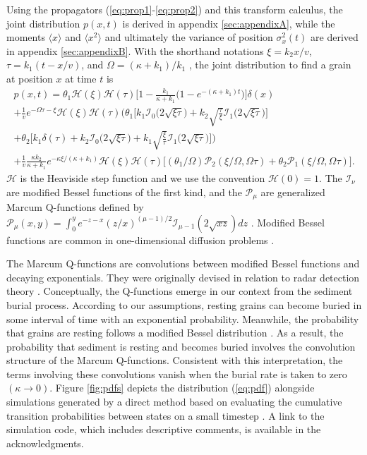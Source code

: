 \documentclass[]{agujournal2018}
\newcommand\bra{\langle}
\newcommand\ket{\rangle}
\begin{document}
Using the propagators (\ref{eq:prop1}-\ref{eq:prop2}) and this transform calculus, the joint distribution $p(x,t)$ is derived in appendix \ref{sec:appendixA}, while the moments $\bra x \ket$ and $\bra x^2 \ket$ and ultimately the variance of position $\sigma_x^2(t)$ are derived in appendix \ref{sec:appendixB}. With the shorthand notations $\xi = k_2 x/v$, $\tau = k_1(t-x/v)$, and $\Omega = (\kappa+k_1)/k_1$ \citep[cf.][]{Lisle1998}, the joint distribution to find a grain at position $x$ at time $t$ is 
\begin{multline}
p(x,t) = \theta_1\mathcal{H}(\xi)\mathcal{H}(\tau)\Big[1-\frac{k_1}{\kappa+k_1}\Big(1-e^{-(\kappa+k_1)t}\Big)\Big]\delta(x) \\ + \frac{1}{v}e^{-\Omega \tau - \xi}\mathcal{H}(\xi)\mathcal{H}(\tau)\Big(\theta_1\Big[k_1\mathcal{I}_0\big(2\sqrt{\xi\tau}\big) + k_2\sqrt{\frac{\tau}{\xi}}\mathcal{I}_1\big(2\sqrt{\xi\tau}\big)\Big] \\ + \theta_2\Big[k_1\delta(\tau) + k_2 \mathcal{I}_0\big(2\sqrt{\xi\tau}\big)+k_1 \sqrt{\frac{\xi}{\tau}}\mathcal{I}_1\big(2\sqrt{\xi\tau}\big)\Big]\Big) \\
+ \frac{1}{v}\frac{\kappa k_2}{\kappa + k_1}e^{-\kappa \xi/(\kappa + k_1)}\mathcal{H}(\xi)\mathcal{H}(\tau)\Big[(\theta_1/\Omega)\mathcal{P}_2(\xi/\Omega,\Omega\tau) + \theta_2 \mathcal{P}_1(\xi/\Omega,\Omega\tau)\Big].
\label{eq:pdf}
\end{multline}
$\mathcal{H}$ is the Heaviside step function and we use the convention $\mathcal{H}(0)=1$.
The $\mathcal{I}_\nu$ are modified Bessel functions of the first kind, and the $\mathcal{P}_\mu$ are generalized Marcum Q-functions defined by $\mathcal{P}_\mu(x,y) = \int_0^y e^{-z-x}(z/x)^{(\mu-1)/2}\mathcal{I}_{\mu-1}(2\sqrt{xz})dz $ \citep{Temme1996}. Modified Bessel functions are common in one-dimensional diffusion problems \citep[e.g.][]{Einstein1937,Giddings1955,Daly2010}. 

The Marcum Q-functions are convolutions between modified Bessel functions and decaying exponentials. They were originally devised in relation to radar detection theory \citep{Marcum1960}. 
Conceptually, the Q-functions emerge in our context from the sediment burial process. According to our assumptions, resting grains can become buried in some interval of time with an exponential probability. Meanwhile, the probability that grains are resting follows a modified Bessel distribution \citep[e.g.][]{Einstein1937,Lisle1998}.
As a result, the probability that sediment is resting and becomes buried involves the convolution structure of the Marcum Q-functions.
Consistent with this interpretation, the terms involving these convolutions vanish when the burial rate is taken to zero $(\kappa \rightarrow 0)$.
Figure \ref{fig:pdfs} depicts the distribution (\ref{eq:pdf}) alongside simulations generated by a direct method based on evaluating the cumulative transition probabilities between states on a small timestep \citep[cf.][]{Barik2006}. A link to the simulation code, which includes descriptive comments, is available in the acknowledgments.
\end{document}
